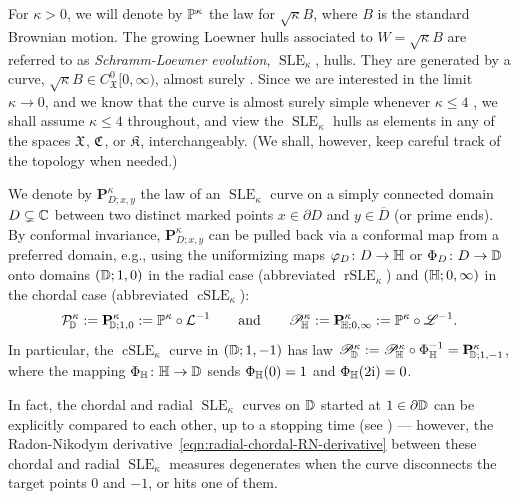 \documentclass[a4paper, 11pt]{article}
\theoremstyle{definition}
\numberwithin{equation}{section}
\numberwithin{figure}{section}
\newcommand{\SLE}[1][]{\operatorname{SLE}_{#1}}
\newcommand{\rSLE}[1][]{\operatorname{rSLE}_{#1}}
\newcommand{\cSLE}[1][]{\operatorname{cSLE}_{#1}}
\newcommand{\rLoewnerTransform}[1][]{\cL{\ifx&#1&\else_{#1}\fi}}
\newcommand{\cLoewnerTransform}[1][]{\mathscr{L}_{\ifx&#1&\else#1\fi}}
\newcommand{\funs}[2][]{C^{0}_{#1}[0,#2}
\newcommand{\Khulls}[1][]{\mathfrak{K}_{#1}}
\newcommand{\Xpaths}[1][]{\mathfrak{X}_{#1}}
\newcommand{\rDmeas}[1]{\mathcal{P}^{#1}_{\!\bD}}
\newcommand{\cHmeas}[1]{\mathscr{P}^{#1}_{\!\bH}}
\newcommand{\cDmeas}[1]{\mathscr{P}^{#1}_{\!\bD}}
\newcommand{\SLEmeasure}[2]{\mathbf{P}^{#2}_{\!\!#1}}
\newcommand{\BMmeasure}[2][]{\bP^{#2}_{\!#1}}
\begin{document}
For $\kappa > 0$, we will denote by $\BMmeasure{\kappa}$ the law for $\sqrt{\kappa}B$, 
where $B$ is the standard Brownian motion. 
The growing Loewner hulls associated to $W = \sqrt{\kappa}B$ are referred to as 
\emph{Schramm-Loewner evolution}, $\SLE[\kappa]$, hulls. 
They are generated by a curve, $\sqrt\kappa B \in \funs[\Xpaths]{\infty)}$, almost surely
\cite[Theorem~5.1]{Rohde-Schramm:Basic_properties_of_SLE}.
Since we are interested in the limit $\kappa \to 0$, 
and we know that the curve is almost surely simple whenever $\kappa \le 4$ 
\cite[Theorem~6.1]{Rohde-Schramm:Basic_properties_of_SLE},  
we shall assume $\kappa \le 4$ throughout, and view the $\SLE[\kappa]$ hulls 
as elements in any of the spaces $\Xpaths$, $\mathfrak{C}$, or $\Khulls$, interchangeably.
(We shall, however, keep careful track of the topology when needed.)


We denote by $\SLEmeasure{D;x,y}{\kappa}$ the law of an $\SLE[\kappa]$ curve on a simply connected domain $D \subsetneq \mathbb{C}$ 
between two distinct marked points $x \in \partial D$ and $y \in \overline{D}$ (or prime ends).
By conformal invariance, $\SLEmeasure{D;x,y}{\kappa}$ 
can be pulled back via a conformal map from a preferred domain, e.g., using the 
uniformizing maps $\varphi_D \colon D \to \mathbb{H}$ or $\Phi_D \colon D \to \mathbb{D}$ 
onto domains $(\mathbb{D}; 1, 0)$ in the radial case (abbreviated $\rSLE[\kappa]$) 
and $(\mathbb{H}; 0, \infty)$ in the chordal case (abbreviated $\cSLE[\kappa]$): 
\begin{align*}
\rDmeas{\kappa} 
:= \SLEmeasure{\bD; 1, 0}{\kappa} := \BMmeasure{\kappa}\circ\rLoewnerTransform^{-1} 
\qquad \textnormal{and} \qquad
\cHmeas{\kappa} 
:= \SLEmeasure{\bH; 0, \infty}{\kappa} := \BMmeasure{\kappa}\circ\cLoewnerTransform^{-1}.
\end{align*}
In particular, the $\cSLE[\kappa]$ curve in $(\mathbb{D}; 1, -1)$ has law 
$\cDmeas{\kappa} := \cHmeas{\kappa} \circ \Phi_\bH^{-1} = \SLEmeasure{\bD; 1, -1}{\kappa}$,
where the mapping $\Phi_{\mathbb{H}} \colon \mathbb{H} \to \mathbb{D}$ sends $\Phi_{\mathbb{H}}(0) = 1$ and $\Phi_{\mathbb{H}}(2\mathrm{i}) = 0$. 


In fact, the chordal and radial $\SLE[\kappa]$ curves on $\mathbb{D}$ started at $1 \in \partial \mathbb{D}$ 
can be explicitly compared to each other,
up to a stopping time (see ) --- 
however, the Radon-Nikodym derivative~\eqref{eqn:radial-chordal-RN-derivative} between these 
chordal and radial $\SLE[\kappa]$ measures degenerates when the curve disconnects the target points $0$ and $-1$, or hits one of them. 
\end{document}
